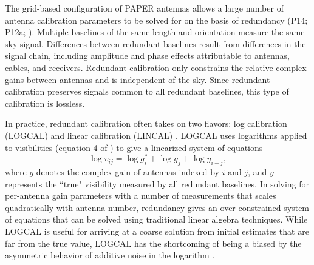 \documentclass[twocolumn,numberedappendix]{emulateapj} \shorttitle{PSA64}
\begin{document}
The grid-based configuration of PAPER antennas allows a large number of antenna
calibration parameters to be solved for on the basis of redundancy (P14; P12a;
\citealt{zheng_et_al2014}).  Multiple baselines of the same length and
orientation measure the same sky signal. Differences between redundant
baselines result from differences in the signal chain, including amplitude and
phase effects attributable to antennas, cables, and receivers.  Redundant
calibration only constrains the relative complex gains between antennas and is
independent of the sky. Since redundant calibration preserves signals common to
all redundant baselines, this type of calibration is lossless. 


In practice, redundant calibration often takes on two flavors: log calibration (LOGCAL) and
linear calibration (LINCAL) \citep{liu_et_al2010,zheng_et_al2014}. LOGCAL uses 
logarithms applied to visibilities (equation 4 of
\citealt{zheng_et_al2014}) to give a linearized system of equations
\begin{equation}\label{eqn:logcal}
    \log{v_{ij}} = \log{g_{i}^{*}} + \log{g_{j}} + \log{y_{i-j}},
\end{equation}
where $g$ denotes the 
complex gain of antennas indexed by $i$ and $j$, and $y$ represents the ``true" visibility 
measured by all redundant baselines.  In solving for per-antenna gain parameters with
a number of measurements that scales quadratically with antenna number, redundancy gives 
an over-constrained
system of equations that can be solved
using traditional linear algebra techniques.
While LOGCAL is useful for arriving at a coarse solution from initial estimates that are far
from the true value, LOGCAL has the shortcoming of being a biased by the asymmetric behavior
of additive noise in the logarithm \citep{liu_et_al2010}.
\end{document}
